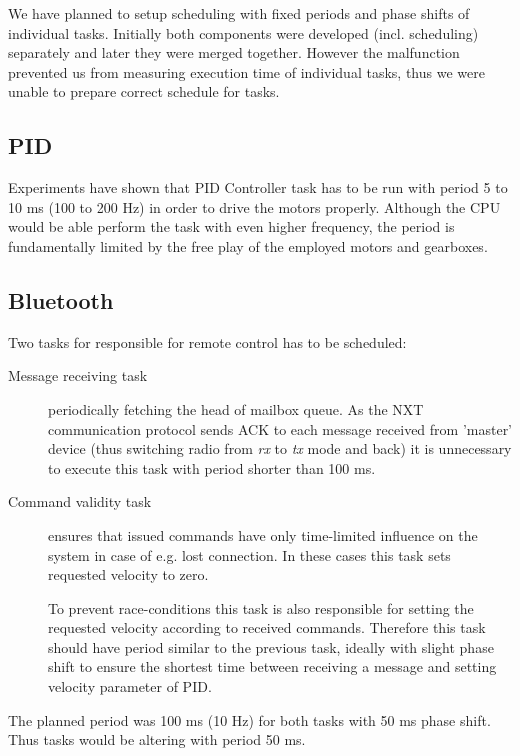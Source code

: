 \documentclass{article}
\begin{document}
We have planned to setup scheduling with fixed periods and phase shifts of individual tasks. Initially both components were developed (incl. scheduling) separately and later they were merged together. However the malfunction prevented us from measuring execution time of individual tasks, thus we were unable to prepare correct schedule for tasks.



\subsection{PID}

Experiments have shown that PID Controller task has to be run with period 5 to 10 ms (100 to 200 Hz) in order to drive the motors properly. Although the CPU would be able perform the task with even higher frequency, the period is fundamentally limited by the free play of the employed motors and gearboxes.

\subsection{Bluetooth}

Two tasks for responsible for remote control has to be scheduled:

\begin{description}
\item[Message receiving task] periodically fetching the head of mailbox queue. As the NXT communication protocol sends ACK to each message received from 'master' device (thus switching radio from \textit{rx} to \textit{tx} mode and back) it is unnecessary to execute this task with period shorter than 100 ms.
\item[Command validity task] ensures that issued commands have only time-limited influence on the system in case of e.g. lost connection. In these cases this task sets requested velocity to zero.

To prevent race-conditions this task is also responsible for setting the requested velocity according to received commands. Therefore this task should have period similar to the previous task, ideally with slight phase shift to ensure the shortest time between receiving a message and setting velocity parameter of PID.
\end{description}

The planned period was 100 ms (10 Hz) for both tasks with 50 ms phase shift. Thus tasks would be altering with period 50 ms.
\end{document}
